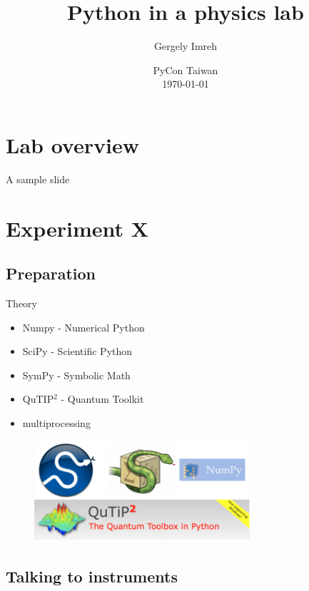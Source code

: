 \documentclass{beamer}
\title{Python in a physics lab}
\author{Gergely Imreh}
\date{PyCon Taiwan \\ \today}
\begin{document}
\maketitle

\section{Lab overview}

\begin{frame}{A sample slide}


\end{frame}

\section{Experiment X}

\subsection{Preparation}

\begin{frame}{Theory}

\begin{itemize}
	\item Numpy - Numerical Python
	\item SciPy - Scientific Python
	\item SymPy - Symbolic Math
	\item QuTIP$^2$ - Quantum Toolkit
	\item multiprocessing
\end{itemize}

\begin{figure}[ht]
	\includegraphics[width=8cm]{numerical.png}
\end{figure}

\end{frame}


\subsection{Talking to instruments}
\end{document}

